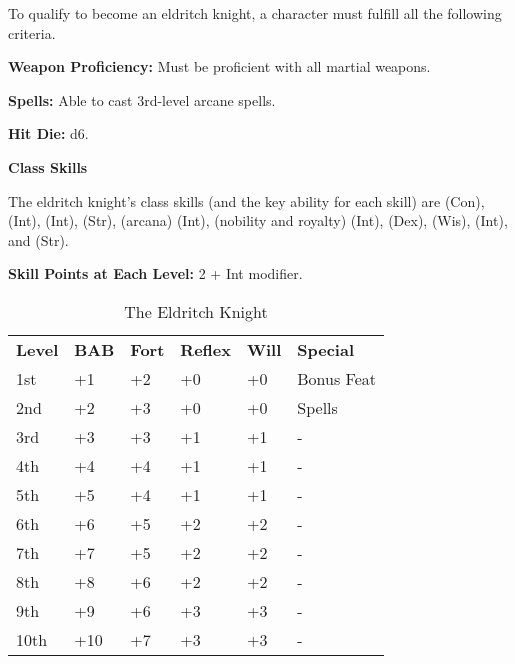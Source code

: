 
\Requirements

To qualify to become an eldritch knight, a character must fulfill all the following 
criteria.

\textbf{Weapon Proficiency:} Must be proficient with all martial weapons.

\textbf{Spells:} Able to cast 3rd-level arcane spells.

\Basics

\textbf{Hit Die:} d6.

\textbf{Class Skills}

The eldritch knight's class skills (and the key ability for each skill) are  
(Con),  (Int),  (Int),  (Str),  (arcana) (Int), 
 (nobility and royalty) (Int),  (Dex),  (Wis),  
(Int), and  (Str). 

\textbf{Skill Points at Each Level:} 2 + Int modifier.

\begin{table}[htb]
\caption{The Eldritch Knight}
\centering
\begin{tabular}{*{6}{l}}
\textbf{Level} & \textbf{BAB} & \textbf{Fort} & \textbf{Reflex} & \textbf{Will} & \textbf{Special}\\
1st & +1 & +2 & +0 & +0 & Bonus Feat\\
2nd & +2 & +3 & +0 & +0 & Spells\\
3rd & +3 & +3 & +1 & +1 & - \\
4th & +4 & +4 & +1 & +1 & - \\
5th & +5 & +4 & +1 & +1 & - \\
6th & +6 & +5 & +2 & +2 & - \\
7th & +7 & +5 & +2 & +2 & - \\
8th & +8 & +6 & +2 & +2 & - \\
9th & +9 & +6 & +3 & +3 & - \\
10th & +10 & +7 & +3 & +3 & - \\
\end{tabular}
\end{table}

